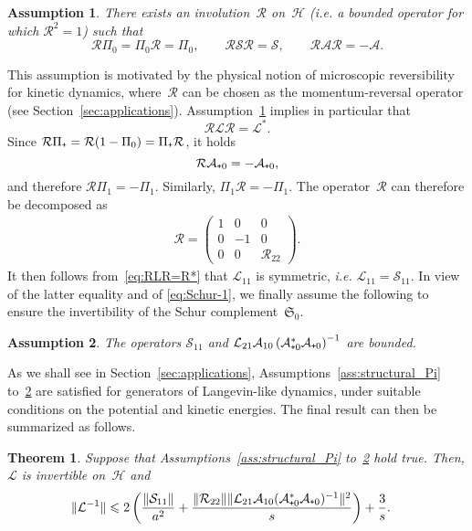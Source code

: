\documentclass{article}
\newtheorem{theorem}{Theorem}
\newtheorem{assumption}{Assumption}
\newcommand{\cL}{\mathcal{L}}
\newcommand{\cLs}{\mathcal{S}}
\newcommand{\cLa}{\mathcal{A}}
\newcommand{\Schur}{\mathfrak{S}_0}
\newcommand{\cR}{\mathcal{R}}
\newcommand{\cH}{\mathcal{H}}
\newcommand{\subplus}{\textnormal{\texttt{+}}}
\renewcommand{\leq}{\leqslant}
\begin{document}
\begin{assumption}
  \label{ass:reversibility}
  There exists an involution~$\cR$ on~$\cH$ (i.e. a bounded operator for which $\cR^2 = 1$) such that
  \[
    \cR \Pi_{0} = \Pi_{0} \cR = \Pi_{0}, \qquad \cR \cLs\cR  = \cLs, \qquad \cR \cLa \cR = - \cLa. 
  \]
\end{assumption}
This assumption is motivated by the physical notion of microscopic reversibility for kinetic dynamics, where~$\cR$ can be chosen as the momentum-reversal operator (see Section~\ref{sec:applications}). Assumption~\ref{ass:reversibility} implies in particular that
\begin{equation}
  \label{eq:RLR=R*}
  \cR \cL \cR = \cL^*.
\end{equation}
Since $\cR\Pi_\subplus = \cR(1-\Pi_0) = \Pi_\subplus \cR$, it holds
\begin{equation}
  \label{eq:R_A+0}
  \cR \cLa_{\subplus0} = -\cLa_{\subplus0},
\end{equation}
and therefore $\cR \Pi_{1} = -\Pi_{1}$. Similarly, $\Pi_{1} \cR = -\Pi_{1}$. The operator~$\cR$ can therefore be decomposed as
\begin{align*}
  \cR =
  \begin{pmatrix}
    1&0&0\\
    0&-1&0\\
    0&0&\cR_{22}
  \end{pmatrix}.
\end{align*}
It then follows from~\eqref{eq:RLR=R*} that $\cL_{11}$ is symmetric,
\emph{i.e.} $\cL_{11} = \cLs_{11}$. In view of the latter equality and
of \eqref{eq:Schur-1}, we finally assume the following to ensure the invertibility of the Schur complement~$\Schur$.
\begin{assumption}
  \label{ass:technical_ass}
  The operators $\cLs_{11}$ and $\cL_{21}\cLa_{10}\left(\cLa_{\subplus0}^* \cLa_{\subplus0}\right)^{-1}$ are bounded.
\end{assumption}

As we shall see in Section~\ref{sec:applications}, Assumptions~\ref{ass:structural_Pi} to~\ref{ass:technical_ass} are satisfied for generators of Langevin-like dynamics, under suitable conditions on the potential and kinetic energies. The final result can then be summarized as follows.

\begin{theorem}
  \label{thm:bounds_Linv}
  Suppose that Assumptions~\ref{ass:structural_Pi} to~\ref{ass:technical_ass} hold true. Then, $\cL$ is invertible on~$\cH$ and
  \[
  \begin{aligned}
    & \|\cL^{-1}\| \leq 2\left( \frac {\|\cLs_{11}\|} {a^{2}} + \frac {\|\cR_{22}\|\|\cL_{21}\cLa_{10}(\cLa_{\subplus0}^{*}\cLa_{\subplus0})^{-1}\|^{2}}{s} \right) + \frac3s.
    \end{aligned}
  \]
\end{theorem}
\end{document}
